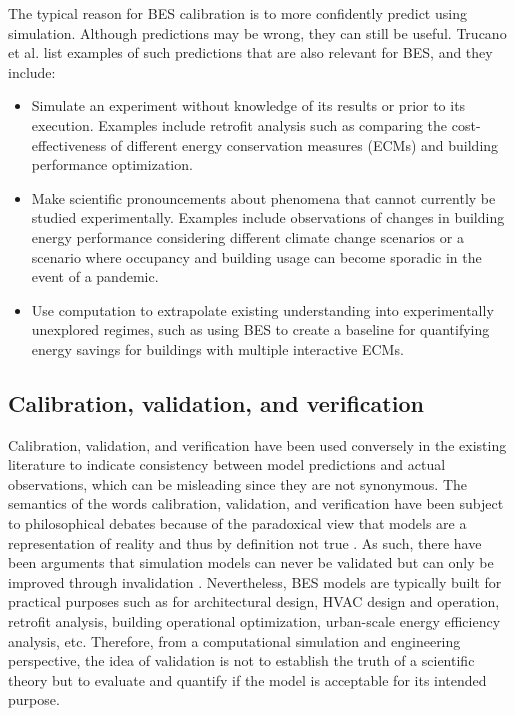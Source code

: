 \documentclass[review]{elsarticle}
\begin{document}
The typical reason for BES calibration is to more confidently predict using simulation. Although predictions may be wrong, they can still be useful. Trucano et al. \cite{trucano2006calibration} list examples of such predictions that are also relevant for BES, and they include: 
\begin{itemize}
    \item Simulate an experiment without knowledge of its results or prior to its execution. Examples include retrofit analysis such as comparing the cost-effectiveness of different energy conservation measures (ECMs) and building performance optimization.
    \item Make scientific pronouncements about phenomena that cannot currently be studied experimentally. Examples include observations of changes in building energy performance considering different climate change scenarios or a scenario where occupancy and building usage can become sporadic in the event of a pandemic.
    \item Use computation to extrapolate existing understanding into experimentally unexplored regimes, such as using BES to create a baseline for quantifying energy savings for buildings with multiple interactive ECMs.
\end{itemize}

\subsection{Calibration, validation, and verification}

Calibration, validation, and verification have been used conversely in the existing literature to indicate consistency between model predictions and actual observations, which can be misleading since they are not synonymous. The semantics of the words calibration, validation, and verification have been subject to philosophical debates because of the paradoxical view that models are a representation of reality and thus by definition not true \cite{oreskes1994verification}. As such, there have been arguments that simulation models can never be validated but can only be improved through invalidation \cite{konikow1992ground}. Nevertheless, BES models are typically built for practical purposes such as for architectural design, HVAC design and operation, retrofit analysis, building operational optimization, urban-scale energy efficiency analysis, etc. Therefore, from a computational simulation and engineering perspective, the idea of validation is not to establish the truth of a scientific theory but to evaluate and quantify if the model is acceptable for its intended purpose. 
\end{document}

